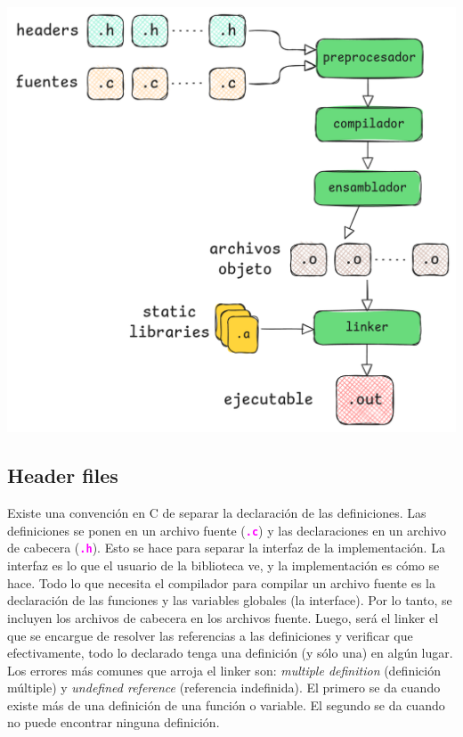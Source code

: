 \documentclass[]{scrartcl}
\newcommand{\hl}[1]{\textcolor{magenta}{\textbf{\texttt{#1}}}}
\begin{document}
\begin{center}
  \includegraphics[scale=0.3]{./img/compilacion.png}
  
  \label{fig:compilacion}
\end{center}



\subsection*{Header files}

Existe una convención en C de separar la declaración de las definiciones. Las definiciones se ponen en un archivo fuente (\hl{.c}) y las declaraciones en un archivo de cabecera (\hl{.h}). Esto se hace para separar la interfaz de la implementación. La interfaz es lo que el usuario de la biblioteca ve, y la implementación es cómo se hace. Todo lo que necesita el compilador para compilar un archivo fuente es la declaración de las funciones y las variables globales (la interface). Por lo tanto, se incluyen los archivos de cabecera en los archivos fuente. Luego, será el linker el que se encargue de resolver las referencias a las definiciones y verificar que efectivamente, todo lo declarado tenga una definición (y sólo una) en algún lugar. Los errores más comunes que arroja el linker son: \textit{multiple definition} (definición múltiple) y \textit{undefined reference} (referencia indefinida). El primero se da cuando existe más de una definición de una función o variable. El segundo se da cuando no puede encontrar ninguna definición.
\end{document}
